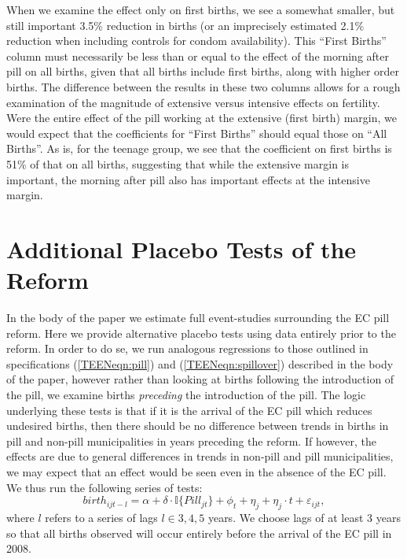 \documentclass[11pt,subeqn]{article}
\begin{document}
\begin{spacing}{1.4}
When we examine the effect only on first births, we see a somewhat smaller, but
still important 3.5\% reduction in births (or an imprecisely estimated 2.1\% 
reduction when including controls for condom availability).  This ``First Births''
column must necessarily be less than or equal to the effect of the morning after 
pill on all births, given that all births include first births, along with higher 
order births.  The difference between the results in these two columns allows
for a rough examination of the magnitude of extensive versus intensive effects
on fertility.  Were the entire effect of the pill working at the extensive 
(first birth) margin, we would expect that the coefficients for ``First Births''
should equal those on ``All Births''.  As is, for the teenage group, we see
that the coefficient on first births is 51\% of that on all births, suggesting
that while the extensive margin is important, the morning after pill also has
important effects at the intensive margin.



\clearpage
\section{Additional Placebo Tests of the Reform}
\label{TEENsscn:placebo}
In the body of the paper we estimate full event-studies surrounding the EC pill
reform. Here we provide alternative placebo tests using data entirely prior to
the reform. In order to do se, we run analogous regressions to those outlined in
specifications (\ref{TEENeqn:pill}) and (\ref{TEENeqn:spillover}) described in 
the body of the paper, however rather than looking at births following the 
introduction of the pill, we examine births \emph{preceding} the introduction of 
the pill.  The logic underlying these tests is that if it is the arrival of the 
EC pill which reduces undesired births, then there should be no difference 
between trends in births in pill and non-pill municipalities in years preceding 
the reform.  If however, the effects are due to general differences in trends in 
non-pill and pill municipalities, we may expect that an effect would be seen even 
in the absence of the EC pill.  We thus run the following series of tests:
\begin{equation}\tag{A1}
 \label{TEENeqn:placebo}
birth_{ijt-l} = \alpha + \delta\cdot \mathbb{I}\{Pill_{jt}\} + \phi_t + \eta_j + 
\eta_j\cdot t + \varepsilon_{ijt},
\end{equation}
where $l$ refers to a series of lags $l\in 3,4,5$ years.  We choose lags of
at least 3 years so that all births observed will occur entirely before the 
arrival of the EC pill in 2008.


\end{spacing}
\end{document}
